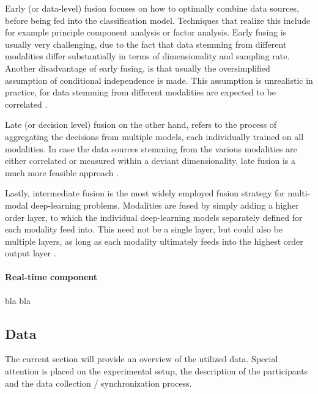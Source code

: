 \documentclass{article}
\begin{document}
Early (or data-level) fusion focuses on how to optimally combine data sources, before being fed into the classification model. Techniques that realize this include for example principle component analysis or factor analysis. Early fusing is usually very challenging, due to the fact that data stemming from different modalities differ substantially in terms of dimensionality and sampling rate. Another disadvantage of early fusing, is that usually the oversimplified assumption of conditional independence is made. This assumption is unrealistic in practice, for data stemming from different modalities are expected to be correlated \cite{ramachandram2017deep}. 

Late (or decision level) fusion on the other hand, refers to the process of aggregating the decisions from multiple models, each individually trained on all modalities. In case the data sources stemming from the various modalities are either correlated or measured within a deviant dimensionality, late fusion is a much more feasible approach \cite{ramachandram2017deep}.

Lastly, intermediate fusion is the most widely employed fusion strategy for multi-modal deep-learning problems. Modalities are fused by simply adding a higher order layer, to which the individual deep-learning models separately defined for each modality feed into. This need not be a single layer, but could also be multiple layers, as long as each modality ultimately feeds into the highest order output layer \cite{ramachandram2017deep}.

\paragraph{Real-time component}
bla bla 

\subsection{Data}
The current section will provide an overview of the utilized data. Special attention is placed on the experimental setup, the description of the participants and the data collection / synchronization process. 
\end{document}
